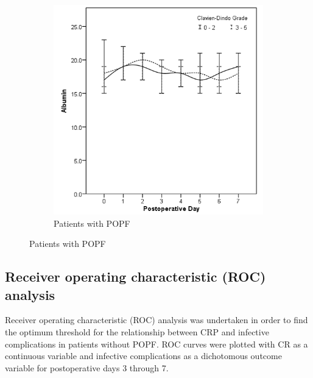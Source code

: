 \begin{figure}[t]
\begin{subfigure}{0.48\textwidth}
		\includegraphics[width=\textwidth]{Figures/crp_comp_Albumin_infective_leak1}
		\caption{Patients with POPF}
		\label{fig:crp_comp_Albumin_infective_leak1}
	\end{subfigure}
\end{figure}
\vfill

\clearpage

\subsection{Receiver operating characteristic (ROC) analysis}
Receiver operating characteristic (ROC) analysis was undertaken in order to find the optimum threshold for the relationship between CRP and infective complications in patients without POPF. ROC curves were plotted with CR as a continuous variable and infective complications as a dichotomous outcome variable for postoperative days 3 through 7. 

